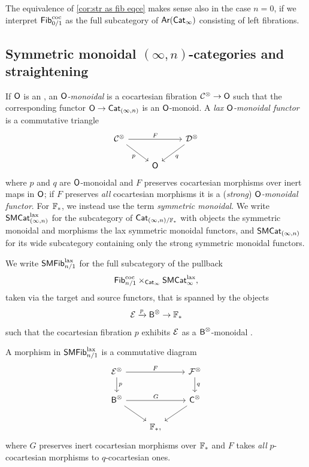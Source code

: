 \documentclass[a4paper,11pt]{article}
\begin{document}
\begin{remark}\label{rmk:str as fib 0}
  The equivalence of \cref{cor:str as fib eqce} makes sense also in
  the case $ n =0$, if we interpret $\textup{\textsf{Fib}}_{0/1}^{\text{\textup{coc}}}$ as the full
  subcategory of $\textup{\textsf{Ar}}(\textup{\textsf{Cat}}_\infty)$ consisting of left fibrations.
\end{remark}

\subsection{Symmetric monoidal $(\infty,n)$-categories and
  straightening}
\label{sec:symmon}

\begin{defn}
  If $\textup{\textsf{O}}$ is an \iopd{}, an \emph{$\textup{\textsf{O}}$-monoidal \incat{}} is a cocartesian
  fibration $\eC^{\otimes} \to \uO$ such that the corresponding
  functor $\oO \to \CatIn$ is an $\textup{\textsf{O}}$-monoid. A \emph{lax
    $\textup{\textsf{O}}$-monoidal functor} is a commutative triangle
  \[
    \begin{tikzcd}
     \eC^{\otimes} \ar[rr, "F"] \ar[dr, "p"'] & & \eD^{\otimes} \ar[dl, "q"] \\
      & \oO
    \end{tikzcd}
  \]
  where $p$ and $q$ are $\textup{\textsf{O}}$-monoidal \incats{} and $F$ preserves
  cocartesian morphisms over inert maps in $\textup{\textsf{O}}$; if $F$ preserves
  \emph{all} cocartesian morphisms it is a (\emph{strong}) \emph{$\textup{\textsf{O}}$-monoidal functor}.
  For $\mathbb{F}_{*}$, we instead use the term \emph{symmetric monoidal}. We
  write $\textup{\textsf{SMCat}}_{(\infty,n)}^{\text{\textup{lax}}}$ for the subcategory of $\textup{\textsf{Cat}}_{(\infty,n)/\mathbb{F}_{*}}$ with
  objects the symmetric monoidal \incats{} and morphisms the lax
  symmetric monoidal functors, and $\textup{\textsf{SMCat}}_{(\infty,n)}$ for its wide subcategory
  containing only the strong symmetric monoidal functors.
\end{defn}

\begin{notation}
  We write $\textup{\textsf{SMFib}}^{\text{\textup{lax}}}_{n/1}$ for the full subcategory of the pullback
  \[ \textup{\textsf{Fib}}_{n/1}^{\text{\textup{coc}}} \times_{\textup{\textsf{Cat}}_\infty} \textup{\textsf{SMCat}}^{\text{\textup{lax}}}_{\infty},\]
  taken via the target and source functors, that is spanned by the
  objects
  \[ \nE \xto{p} \oB^{\otimes} \to \xF_{*}\]
  such that the cocartesian fibration $p$ exhibits $\mathcal{E}$ as a
  $\textup{\textsf{B}}^{\otimes}$-monoidal \incat{}.
\end{notation}

\begin{observation}
  A morphism in $\textup{\textsf{SMFib}}^{\text{\textup{lax}}}_{n/1}$ is a
  commutative diagram
  \begin{equation}
    \label{eq:smfib mor}
    \begin{tikzcd}
      \nE^{\otimes} \ar[rr, "F"] \ar[d, "p"] & & \nF^{\otimes} \ar[d, "q"] \\
      \oB^{\otimes} \ar[rr, "G"] \ar[dr] & & \oC^{\otimes} \ar[dl] \\
      & \xF_{*},
    \end{tikzcd}
  \end{equation}
  where $G$ preserves inert cocartesian morphisms over $\mathbb{F}_{*}$ and
  $F$ takes \emph{all} $p$-cocartesian morphisms to $q$-cocartesian ones.
\end{observation}
\end{document}
